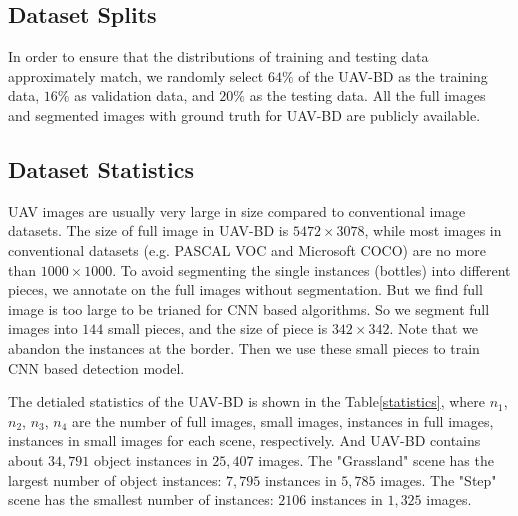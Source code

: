 \subsection{Dataset Splits}

In order to ensure that the distributions of training and testing data approximately match, we randomly select $ 64\% $ of the UAV-BD as the training data, $ 16\% $ as validation data, and $ 20\% $ as the testing data. All the full images and segmented images with ground truth for UAV-BD are publicly available.



\subsection{Dataset Statistics}
\label{ssec:Dataset_Statistics}
UAV images are usually very large in size compared to conventional image datasets. The size of full image in UAV-BD is $ 5472\times 3078 $, while most images in conventional datasets (e.g. PASCAL VOC and Microsoft COCO) are no more than $ 1000\times 1000 $\cite{RCNNforSmall}. To avoid segmenting the single instances (bottles) into different pieces, we annotate on the full images without segmentation. But we find full image is too large to be trianed for CNN based algorithms. So we segment full images into $ 144 $ small pieces, and the size of piece is $ 342\times 342 $. Note that we abandon the instances at the border. Then we use these small pieces to train CNN based detection model. 


The detialed statistics of the UAV-BD is shown in the Table\ref{statistics}, where $ n_1 $, $ n_2 $, $ n_3 $,  $ n_4 $ are the number of full images, small images, instances in full images, instances in small images for each scene, respectively. And UAV-BD contains about $ 34,791 $ object instances in $ 25,407 $ images. The "Grassland" scene has the largest number of object instances: $ 7,795 $ instances in $ 5,785 $ images. The "Step" scene has the smallest number of instances: $ 2106 $ instances in $ 1,325 $ images.



